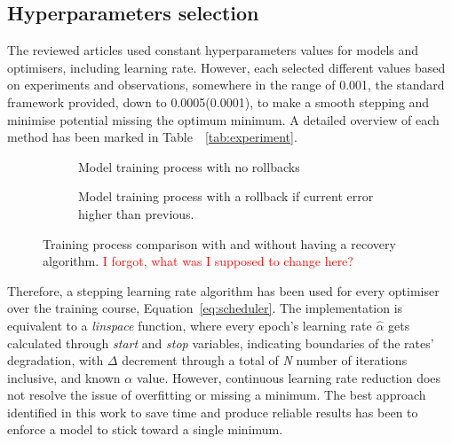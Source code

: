 \subsection{Hyperparameters selection} \label{subsec:l-rate}
%
The reviewed articles used constant hyperparameters values for models and optimisers, including learning rate.
However, each selected different values based on experiments and observations, somewhere in the range of 0.001, the standard framework provided, down to 0.0005(0.0001), to make a smooth stepping and minimise potential missing the optimum minimum.
A detailed overview of each method has been marked in \mbox{Table ~\ref{tab:experiment}}.

%
\begin{figure}[htbp]
  \centering
  \begin{subfigure}[b]{0.45\textwidth}
      \centering
      
      \caption{Model training process with no rollbacks}
      \label{subfig:no-rollback}
  \end{subfigure}
  \hfill
  \begin{subfigure}[b]{0.45\textwidth}
      \centering
      
      \caption{Model training process with a rollback if current error higher than previous.}
      \label{subfig:rollback}
  \end{subfigure}
  \caption{Training process comparison with and without having a recovery algorithm. \textcolor{red}{I forgot, what was I supposed to change here?}}
  \label{fig:rollback}
\end{figure}
Therefore, a stepping learning rate algorithm has been used for every optimiser over the training course, Equation~\ref{eq:scheduler}.
The implementation is equivalent to a \textit{linspace} function, where every epoch's learning rate $\hat{\alpha}$ gets calculated through \textit{start} and \textit{stop} variables, indicating boundaries of the rates' degradation, with $\Delta$ decrement through a total of \textit{N} number of iterations inclusive, and known $\alpha$ value.
However, continuous learning rate reduction does not resolve the issue of overfitting or missing a minimum.
The best approach identified in this work to save time and produce reliable results has been to enforce a model to stick toward a single minimum.
